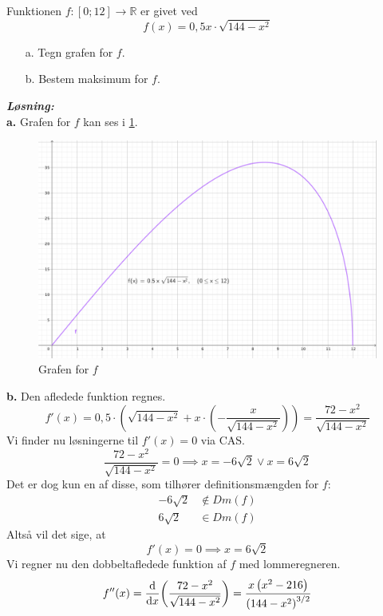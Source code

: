 \documentclass{report}
\newcommand{\sol}{\setlength{\parindent}{0cm}\textbf{\textit{Løsning:}}\setlength{\parindent}{1cm}}
\begin{document}
\begin{question}{}{}
Funktionen $f:[0;12]\to \mathbb{R}$ er givet ved 
\[
f(x)= 0,5x \cdot \sqrt{144-x^2} 
\] 
\begin{itemize}
  \item[a.] Tegn grafen for $f$.
  \item[b.] Bestem maksimum for $f$.
\end{itemize}
\end{question}
\sol \\ 
\textbf{a.}
Grafen for $f$ kan ses i \cref{fig:opg2}.
\begin{figure}[H]
\begin{center}
  \includegraphics[width=\textwidth]{opg2.png}
\end{center}
\caption{Grafen for $f$}
\label{fig:opg2}
\end{figure}
\noindent \textbf{b.}
Den afledede funktion regnes.
\[
f'(x)=0,5\cdot \left(\sqrt{144-x^2} + x \cdot \left(-\frac{x}{\sqrt{144-x^2} }\right) \right)
=\frac{72-x^2}{\sqrt{144-x^2} }
\] 
Vi finder nu løsningerne til $f'(x)=0$ via CAS.
\[
\frac{72-x^2}{\sqrt{144-x^2} }=0 \implies x=-6 \sqrt{2} \lor x=6 \sqrt{2} 
\] 
Det er dog kun en af disse, som tilhører definitionsmængden for $f$:
\begin{equation*}
\begin{split}
  -6 \sqrt{2} &\not\in Dm(f)\\ 
  6 \sqrt{2} &\in Dm(f)
\end{split}
\end{equation*}
Altså vil det sige, at
\[
f'(x)=0 \implies x=6 \sqrt{2} 
\] 
Vi regner nu den dobbeltafledede funktion af $f$ med lommeregneren. 
\[
f''(x)=\dv{x} (\frac{72-x^2}{\sqrt{144-x^2} })
=\frac{x\left(x^2-216\right)}{\left(144-x^2\right)^{3/2}}
\] 
\end{document}
